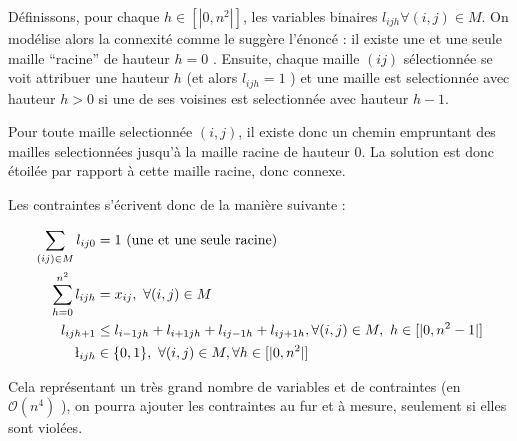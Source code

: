 \documentclass[12pt,a4paper]{article}
\begin{document}
Définissons, pour chaque $h\in [| 0,n^2 |] $, les variables binaires $ l_{ijh} \forall (i,j) \in M$.
On modélise alors la connexité comme le suggère l'énoncé : il existe une et une seule maille ``racine''  de hauteur $h=0$ . Ensuite, chaque maille $(ij)$ sélectionnée se voit attribuer une hauteur $h$ (et alors $l_{ijh}=1$ ) et une maille est selectionnée avec hauteur $h>0$ si une de ses voisines est selectionnée avec hauteur $h-1$.

Pour toute maille selectionnée $(i,j)$, il existe donc un chemin empruntant des mailles selectionnées jusqu'à la maille racine de hauteur 0. La solution est donc étoilée par rapport à cette maille racine, donc connexe.

Les contraintes s'écrivent donc de la manière suivante : 

\begin{align} \label{Cconnex}
\sum_{(ij)\in M} l_{ij0} &= 1 \ \text{(une et une seule racine)} \\
\sum_{h=0}^{n^2} l_{ijh} &= x_{ij} , \ \forall (i,j) \in M \\
l_{ijh+1} & \leq l_{i-1jh} +l_{i+1jh} +l_{ij-1h} +l_{ij+1h}, \forall (i,j) \in M, \ h\in [|0, n^2 -1|] \\
\l_{ijh} & \in \{0,1\} , \ \forall (i,j) \in M, \forall h\in [|0, n^2|] 
\end{align}

Cela représentant un très grand nombre de variables et de contraintes (en $\mathcal{O}(n^4) $ ), on pourra ajouter les contraintes au fur et à mesure, seulement si elles sont violées.
\end{document}
